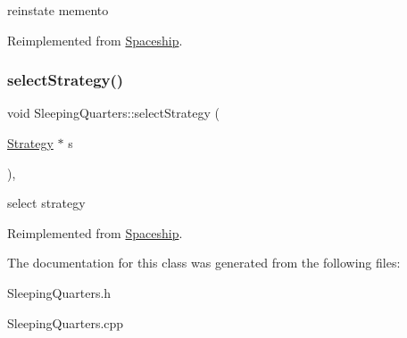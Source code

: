 reinstate memento 

Reimplemented from \hyperlink{classSpaceship_ab075c869473344b6471c8e28ca7ea61e}{Spaceship}.

\mbox{\label{classSleepingQuarters_a9a3c4618cd1a852984c0adba025c159f}} 
\subsubsection{\texorpdfstring{select\+Strategy()}{selectStrategy()}}
{\footnotesize\ttfamily void Sleeping\+Quarters\+::select\+Strategy (\begin{DoxyParamCaption}\item[{\hyperlink{classStrategy}{Strategy} $\ast$}]{s }\end{DoxyParamCaption})\hspace{0.3cm}{\ttfamily [inline]}, {\ttfamily [virtual]}}

select strategy 

Reimplemented from \hyperlink{classSpaceship_a93be2d9d2b675ef978d866d4cd7a6524}{Spaceship}.



The documentation for this class was generated from the following files\+:\begin{DoxyCompactItemize}
\item 
Sleeping\+Quarters.\+h\item 
Sleeping\+Quarters.\+cpp\end{DoxyCompactItemize}

